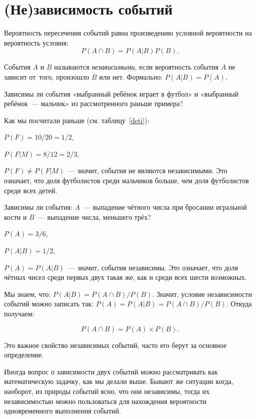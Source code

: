 \documentclass[11pt]{article}
\begin{document}
\section{(Не)зависимость событий}

\begin{theorem*}
	Вероятность пересечения событий равна произведению условной вероятности на вероятность условия:
	$$
	P(A\cap B)=P(A|B)P(B).
	$$
\end{theorem*}

События $A$ и $B$ называются \emph{независимыми}, если вероятность события $A$ не зависит от~того, произошло $B$ или нет. Формально: $P(A|B)=P(A)$.

\begin{example}
	Зависимы ли события «выбранный ребёнок играет в футбол» и «выбранный ребёнок~--- мальчик» из рассмотренного раньше примера?
	
	Как мы посчитали раньше (см. таблицу~\ref{deti}):
	
	$P(F)=10/20=1/2$,
	
	$P(F |M)=8/12=2/3$,
	
	$P(F)\neq P(F |M)$~--- значит, события не являются независимыми. Это означает, что доля футболистов среди мальчиков больше, чем доля футболистов среди всех детей.
\end{example}

\begin{example}
	Зависимы ли события: $A$~--- выпадение чётного числа при бросании игральной кости и $B$~--- выпадение числа, меньшего трёх?
	
	$P(A)=3/6$,
	
	$P(A|B)=1/2$,
	
	$P(A)= P(A|B)$~--- значит, события независимы. Это означает, что доля чётных чисел среди первых двух такая же, как и среди всех шести возможных.
\end{example}

Мы знаем, что: $P(A|B) =P(A\cap B)/P(B)$. Значит, условие независимости событий можно записать так: $P(A)=P(A|B)=P(A\cap B)/P(B)$. Откуда получаем:

$$P(A\cap B)=P(A)\times P(B).$$

Это важное свойство независимых событий, часто его берут за основное определение.

Иногда вопрос о зависимости двух событий можно рассматривать как математическую задачку, как мы делали выше. Бывают же ситуации когда, наоборот, из природы событий ясно, что они независимы, тогда их независимостью можно пользоваться для нахождения вероятности одновременного выполнения событий.
\end{document}
